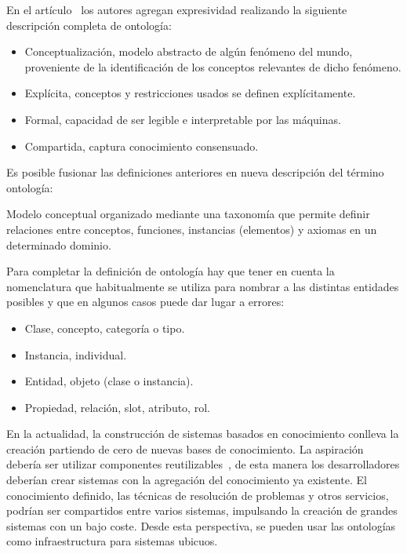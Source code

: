 En el artículo~\cite{Studer98knowledge} los autores agregan
expresividad realizando la siguiente descripción completa de ontología:
\begin{itemize}
  \item Conceptualización, modelo abstracto de algún fenómeno del mundo,
  proveniente de la identificación de los conceptos relevantes de dicho
  fenómeno. \item Explícita, conceptos y restricciones usados se definen
  explícitamente. \item Formal, capacidad de ser legible e interpretable por las
  máquinas.
  \item Compartida, captura conocimiento consensuado.
\end{itemize}

Es posible fusionar las definiciones anteriores en nueva descripción del término ontología:
\begin{definition}
Modelo conceptual organizado mediante una taxonomía que permite definir
relaciones entre conceptos, funciones, instancias (elementos) y axiomas en un determinado
dominio.
\end{definition}

Para completar la definición de ontología hay que tener en cuenta la
nomenclatura que habitualmente se utiliza para nombrar a las distintas entidades
posibles y que en algunos casos puede dar lugar a errores:

\begin{itemize}
  \item Clase, concepto, categoría o tipo.
  \item Instancia, individual.
  \item Entidad, objeto (clase o instancia).
  \item Propiedad, relación, slot, atributo, rol.
\end{itemize}

En la actualidad, la construcción de sistemas basados en conocimiento conlleva la
creación partiendo de cero de nuevas bases de conocimiento. La aspiración debería ser
utilizar componentes reutilizables~\cite{Gruber93towards}, de esta manera los desarrolladores deberían
crear sistemas con la agregación del conocimiento ya existente. El conocimiento definido, 
las técnicas de resolución de problemas y otros servicios, podrían ser
compartidos entre varios sistemas, impulsando la creación de grandes sistemas con
un bajo coste. Desde esta perspectiva, se pueden usar las ontologías como
infraestructura para sistemas ubicuos.

